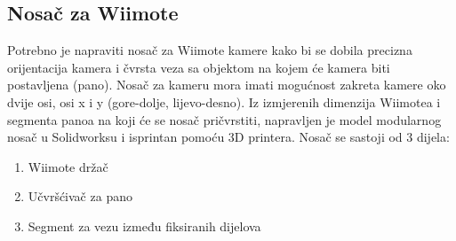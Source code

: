 \documentclass[times, utf8, diplomski]{fer}
\begin{document}
\subsection{Nosač za Wiimote}
Potrebno je napraviti nosač za Wiimote kamere kako bi se dobila precizna orijentacija kamera i čvrsta veza sa objektom na kojem će kamera biti postavljena (pano). Nosač za kameru mora imati mogućnost zakreta kamere oko dvije osi, osi x i y (gore-dolje, lijevo-desno). Iz izmjerenih dimenzija Wiimotea i segmenta panoa na koji će se nosač pričvrstiti, napravljen je model modularnog nosač u Solidworksu i isprintan pomoću 3D printera. Nosač se sastoji od 3 dijela:

\begin{enumerate}
	\item Wiimote držač
	\item Učvršćivač za pano
	\item Segment za vezu između fiksiranih dijelova 
\end{enumerate}
\end{document}
